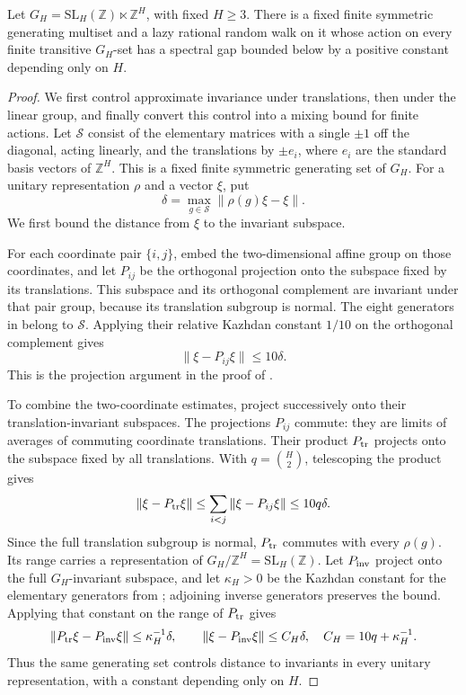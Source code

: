 \begin{lemma}\label{lem:env-affine}
Let
$G_H=\mathrm{SL}_H(\mathbb Z)\ltimes\mathbb Z^H$, with fixed
$H\ge3$. There is a fixed finite symmetric generating multiset and a
lazy rational random walk on it whose action on every finite transitive
$G_H$-set has a spectral gap bounded below by a positive constant
depending only on $H$.
\end{lemma}

\begin{proof}
We first control approximate invariance under translations, then under the linear group, and finally convert this control into a mixing bound for finite actions. Let $\mathcal S$ consist of the elementary matrices with a single
$\pm1$ off the diagonal, acting linearly, and the translations by
$\pm e_i$, where $e_i$ are the standard basis vectors of $\mathbb Z^H$.
This is a fixed finite symmetric generating set of $G_H$.
For a unitary representation $\rho$ and a vector $\xi$, put
\[
\delta=\max_{g\in\mathcal S}\|\rho(g)\xi-\xi\|.
\]
We first bound the distance from $\xi$ to the invariant subspace.

For each coordinate pair $\{i,j\}$, embed the two-dimensional affine
group on those coordinates, and let $P_{ij}$ be the orthogonal projection
onto the subspace fixed by its translations. This subspace and its
orthogonal complement are invariant under that pair group, because its
translation subgroup is normal. The eight generators in
\cite[Theorem~2.1, p.~152]{Shalom1999} belong to $\mathcal S$. Applying their
relative Kazhdan constant $1/10$ on the orthogonal complement gives
\[
\|\xi-P_{ij}\xi\|\le10\delta.
\]
This is the projection argument in the proof of
\cite[Corollary~2.3, p.~154]{Shalom1999}.

To combine the two-coordinate estimates, project successively onto their translation-invariant subspaces. The projections $P_{ij}$ commute: they are limits of averages of
commuting coordinate translations. Their product $P_{\rm tr}$ projects onto
the subspace fixed by all translations. With $q=\binom H2$, telescoping
the product gives
\[
\|\xi-P_{\rm tr}\xi\|
\le\sum_{i<j}\|\xi-P_{ij}\xi\|
\le10q\delta.
\]
Since the full translation subgroup is normal, $P_{\rm tr}$ commutes
with every $\rho(g)$. Its range carries a representation of
$G_H/\mathbb Z^H=\mathrm{SL}_H(\mathbb Z)$. Let $P_{\rm inv}$ project onto the
full $G_H$-invariant subspace, and let $\kappa_H>0$ be the Kazhdan
constant for the elementary generators from
\cite[Theorem~2.6, p.~156]{Shalom1999}; adjoining inverse generators
preserves the bound. Applying that constant on the range of
$P_{\rm tr}$ gives
\[
\|P_{\rm tr}\xi-P_{\rm inv}\xi\|\le\kappa_H^{-1}\delta,
\qquad
\|\xi-P_{\rm inv}\xi\|\le C_H\delta,
\quad C_H=10q+\kappa_H^{-1}.
\]
Thus the same generating set controls distance to invariants in every
unitary representation, with a constant depending only on $H$.


\end{proof}
